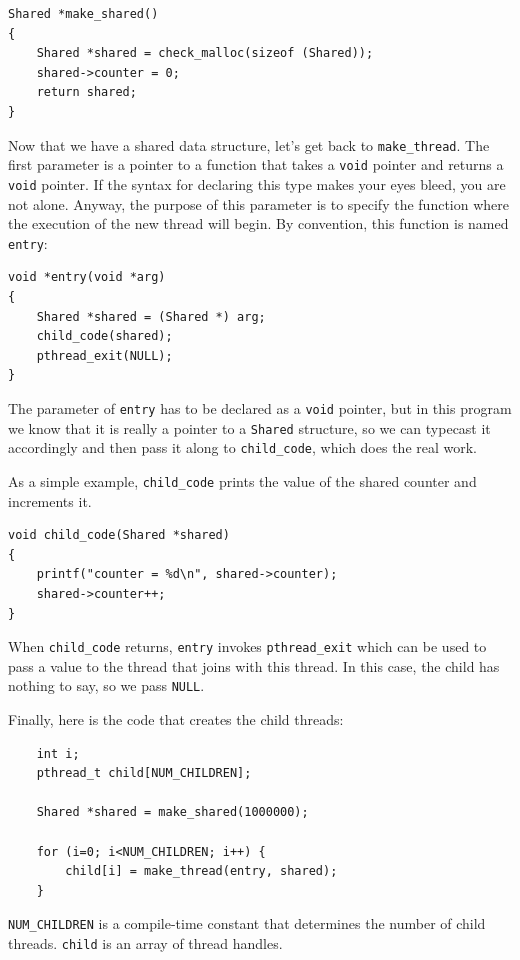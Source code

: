 \documentclass[12pt]{book}
\begin{document}
{\begin{verbatim}
Shared *make_shared()
{
    Shared *shared = check_malloc(sizeof (Shared));
    shared->counter = 0;
    return shared;
}
\end{verbatim}

Now that we have a shared data structure, let's get back to
\verb"make_thread".
The first parameter is a pointer to a function that takes
a {\tt void} pointer and returns a {\tt void} pointer.  If the syntax
for declaring this type makes your eyes bleed, you are not alone.
Anyway, the purpose of this parameter is to specify the function where
the execution of the new thread will begin.  By convention, this
function is named {\tt entry}:

\begin{verbatim}
void *entry(void *arg)
{
    Shared *shared = (Shared *) arg;
    child_code(shared);
    pthread_exit(NULL);
}
\end{verbatim}

The parameter of {\tt entry} has to be declared as a {\tt void}
pointer, but in this program we know that it is really a pointer to a
{\tt Shared} structure, so we can typecast it accordingly and then
pass it along to {\tt child\_code}, which does the real work.

As a simple example, \verb"child_code" prints the value of
the shared counter and increments it.

\begin{verbatim}
void child_code(Shared *shared)
{  
    printf("counter = %d\n", shared->counter);
    shared->counter++;
}
\end{verbatim}

When {\tt child\_code} returns, {\tt entry} invokes
\verb"pthread_exit" which can be used to pass a value to the thread
that joins with this thread.  In this case, the child has nothing to
say, so we pass {\tt NULL}.

Finally, here is the code that creates the child threads:

\begin{verbatim}
    int i;
    pthread_t child[NUM_CHILDREN];

    Shared *shared = make_shared(1000000);

    for (i=0; i<NUM_CHILDREN; i++) {
        child[i] = make_thread(entry, shared);
    }
\end{verbatim}

\verb"NUM_CHILDREN" is a compile-time constant that determines
the number of child threads.  {\tt child} is an array of
thread handles.


}
\end{document}
